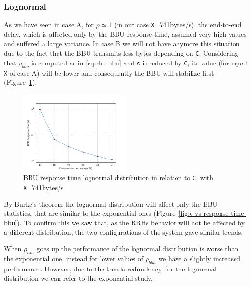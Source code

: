 \documentclass[11pt,a4paper,oneside, openright]{article}
\begin{document}
\subsubsection{Lognormal}
As we have seen in case A, for $\rho \simeq 1$ (in our case \texttt{X}=741bytes/s), the end-to-end delay, which is affected only by the BBU response time, assumed very high values and suffered a large variance. In case B we will not have anymore this situation due to the fact that the BBU transmits less bytes depending on \texttt{C}. Considering that $\rho_{bbu}$ is computed as in \ref{eq:rho-bbu} and \texttt{s} is reduced by \texttt{C}, its value (for equal \texttt{X} of case A) will be lower and consequently the BBU will stabilize first (Figure~\ref{fig:c-vs-resp-741-logn}).

\begin{figure}[h]
	\centering
	\includegraphics[width=0.5\textwidth]{images/response-time-bbu-741-logn}
	\caption{BBU response time lognormal distribution in relation to \texttt{C}, with \texttt{X}=741bytes/s}
	\label{fig:c-vs-resp-741-logn}
\end{figure}

By Burke's theorem the lognormal distribution will affect only the BBU statistics, that are similar to the exponential ones (Figure~\ref{fig:c-vs-response-time-bbu}). To confirm this we saw that, as the RRHs behavior will not be affected by a different distribution, the two configurations of the system gave similar trends. 

When $\rho_{bbu}$ goes up the performance of the lognormal distribution is worse than the exponential one, instead for lower values of $\rho_{bbu}$ we have a slightly increased performance. However, due to the trends redundancy, for the lognormal distribution we can refer to the exponential study.
\end{document}
